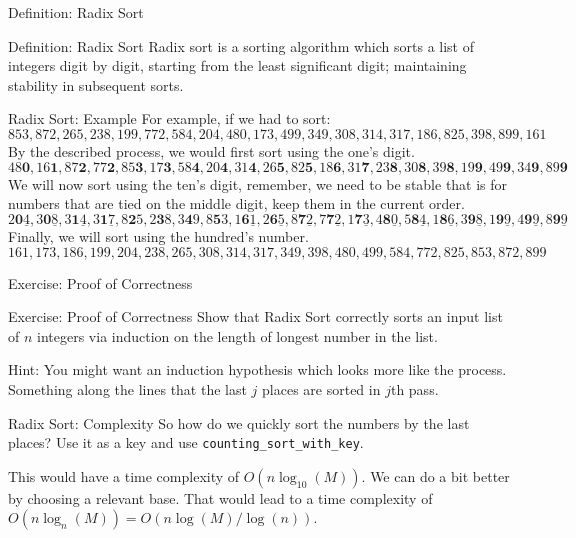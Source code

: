 \documentclass[9pt]{beamer}
\newenvironment{exbox}[1]{\begin{block}{Exercise: #1}}{\end{block}}
\newenvironment{defbox}[1]{\begin{block}{Definition: #1}}{\end{block}}
\begin{document}
\begin{frame}{Definition: Radix Sort}
\begin{defbox}{Radix Sort}
Radix sort is a sorting algorithm which sorts a list of integers digit by digit, starting from the least significant digit; maintaining stability in subsequent sorts.
\end{defbox}
\end{frame}

\begin{frame}{Radix Sort: Example}
\small
For example, if we had to sort:
\[
853, 872, 265, 238, 199, 772, 584, 204, 480, 173, 499, 349, 308, 314, 317, 186, 825, 398, 899, 161
\]
By the described process, we would first sort using the one's digit.
\[
48\mathbf{0}, 16\mathbf{1}, 87\mathbf{2}, 77\mathbf{2}, 85\mathbf{3}, 17\mathbf{3}, 58\mathbf{4}, 20\mathbf{4}, 31\mathbf{4}, 26\mathbf{5}, 82\mathbf{5}, 18\mathbf{6}, 31\mathbf{7}, 23\mathbf{8}, 30\mathbf{8}, 39\mathbf{8}, 19\mathbf{9}, 49\mathbf{9}, 34\mathbf{9}, 89\mathbf{9}
\]
We will now sort using the ten's digit, remember, we need to be stable that is for numbers that are tied on the middle digit, keep them in the current order.
\[
2\mathbf{0}\underline{4}, 3\mathbf{0}\underline{8}, 3\mathbf{1}\underline{4}, 3\mathbf{1}\underline{7}, 8\mathbf{2}5, 2\mathbf{3}8, 3\mathbf{4}9, 8\mathbf{5}3, 1\mathbf{6}\underline{1}, 2\mathbf{6}\underline{5}, 8\mathbf{7}\underline{2}, 7\mathbf{7}\underline{2}, 1\mathbf{7}\underline{3}, 4\mathbf{8}\underline{0}, 5\mathbf{8}\underline{4}, 1\mathbf{8}\underline{6}, 3\mathbf{9}\underline{8}, 1\mathbf{9}\underline{9}, 4\mathbf{9}\underline{9}, 8\mathbf{9}\underline{9}
\]
Finally, we will sort using the hundred's number.
\[
161, 173, 186, 199, 204, 238, 265, 308, 314, 317, 349, 398, 480, 499, 584, 772, 825, 853, 872, 899
\]
\end{frame}

\begin{frame}{Exercise: Proof of Correctness}
\begin{exbox}{Proof of Correctness}
Show that Radix Sort correctly sorts an input list of $n$ integers via induction on the length of longest number in the list.

Hint: You might want an induction hypothesis which looks more like the process. Something along the lines that the last $j$ places are sorted in $j$th pass.
\end{exbox}
\end{frame}

\begin{frame}{Radix Sort: Complexity}
So how do we quickly sort the numbers by the last places? Use it as a key and use \texttt{counting\_sort\_with\_key}.

This would have a time complexity of $O(n\log_{10}(M))$. We can do a bit better by choosing a relevant base. That would lead to a time complexity of $O(n\log_n(M)) = O(n\log(M)/\log(n))$.
\end{frame}
\end{document}
